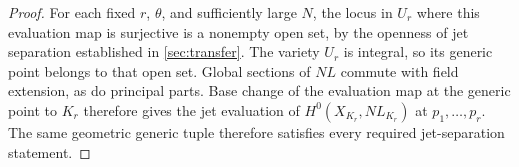 \begin{proof}
For each fixed $r$, $\theta$, and sufficiently large $N$, the locus in $U_r$ where this evaluation map is surjective is a nonempty open set, by the openness of jet separation established in \cref{sec:transfer}. The variety $U_r$ is integral, so its generic point belongs to that open set. Global sections of $NL$ commute with field extension, as do principal parts. Base change of the evaluation map at the generic point to $K_r$ therefore gives the jet evaluation of $H^0(X_{K_r},NL_{K_r})$ at $p_1,\ldots,p_r$.  The same geometric generic tuple therefore satisfies every required jet-separation statement.
\end{proof}
